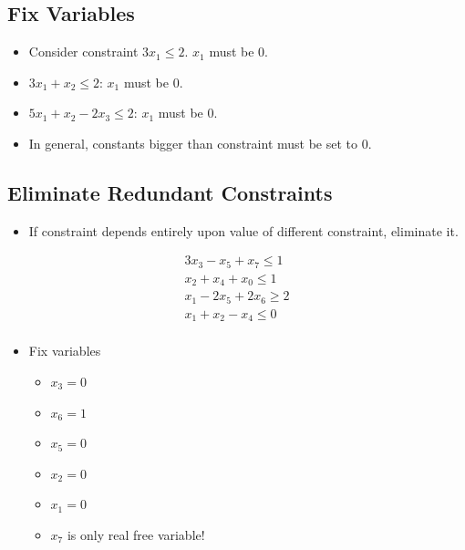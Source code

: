\documentclass[12pt, letter]{article}
\begin{document}
\subsection*{Fix Variables}
\begin{itemize}
    \item Consider constraint $3x_1\le 2$. $x_1$ must be 0.
    \item $3x_1+x_2 \le 2$: $x_1$ must be 0.
    \item $5x_1+x_2-2x_3 \le 2$: $x_1$ must be 0.
    \item In general, constants bigger than constraint must be set to 0.
\end{itemize}

\subsection*{Eliminate Redundant Constraints}
\begin{itemize}
    \item If constraint depends entirely upon value of different constraint, eliminate it.
\end{itemize}

\begin{gather*}
3x_3-x_5+x_7 \le 1 \\
x_2+x_4+x_0 \le 1 \\
x_1-2x_5+2x_6 \ge 2 \\
x_1+x_2-x_4 \le 0 \\
\end{gather*}

\begin{itemize}
    \item Fix variables
    \begin{itemize}
        \item $x_3 = 0$ 
        \item $x_6 = 1$
        \item $x_5 = 0$ 
        \item $x_2 = 0$
        \item $x_1 = 0$ 
        \item $x_7$ is only real free variable!
    \end{itemize}
\end{itemize}
\end{document}
